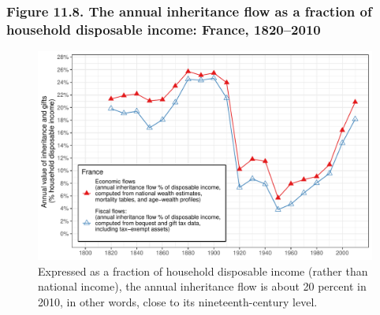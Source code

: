 \documentclass[t]{beamer}\usepackage[]{graphicx}\usepackage[]{color}
\newenvironment{knitrout}{}{} %
\begin{document}
\begin{frame}[label=Figure_11_8]
\frametitle{Figure 11.8. The annual inheritance flow as a fraction of household disposable income: France, 1820--2010}
\begin{figure}[t]
\begin{minipage}[b]{\textwidth}
\centering
\begin{knitrout}\footnotesize
{}\color{fgcolor}

{\centering \includegraphics[width=1\linewidth]{figures/color/Figure_11_8} 

}



\end{knitrout}
\caption{Expressed as a fraction of household disposable income (rather than national income), the annual inheritance flow is about 20 percent in 2010, in other words, close to its nineteenth-century level.}
\end{minipage}
\end{figure}
\end{frame}
\end{document}
